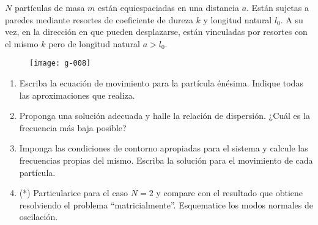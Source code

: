 \item
\(N\) partículas de masa \(m\) están equiespaciadas en una distancia \(a\).
Están sujetas a paredes mediante resortes de coeficiente de dureza \(k\) y longitud natural \(l_0\).
A su vez, en la dirección en que pueden desplazarse, están vinculadas por resortes con el mismo \(k\) pero de longitud natural \(a > l_0\).
\begin{figure}[ht]
	\centering
	\texttt{[image: g-008]}
\end{figure}
\begin{enumerate}
	\item Escriba la ecuación de movimiento para la partícula énésima.
	Indique todas las aproximaciones que realiza.
	\item Proponga una solución adecuada y halle la relación de dispersión.
	¿Cuál es la frecuencia más baja posible?
	\item Imponga las condiciones de contorno apropiadas para el sistema y calcule las frecuencias propias del mismo.
	Escriba la solución para el movimiento de cada partícula.
	\item (*) Particularice para el caso \(N = 2\) y compare con el resultado que obtiene resolviendo el problema ``matricialmente''.
	Esquematice los modos normales de oscilación.
\end{enumerate}



